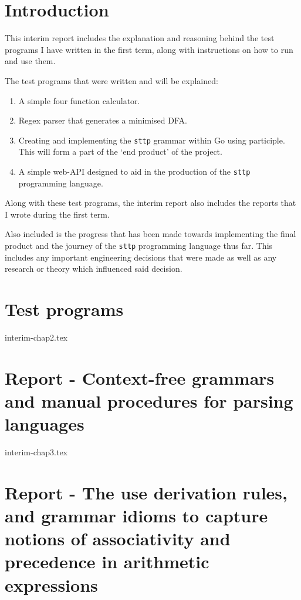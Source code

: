 \documentclass[]{interim}
\theoremstyle{definition}
\begin{document}
\chapter{Introduction}

This interim report includes the explanation and reasoning behind the test programs I have written in the first term, along with instructions on how to run and use them.

\begin{center}
    The test programs that were written and will be explained:
    \vspace{-1em}
    \begin{enumerate}
        \item A simple four function calculator.
        \item Regex parser that generates a minimised DFA.
        \item Creating and implementing the \verb|sttp| grammar within Go using participle. This will form a part of the `end product' of the project.
        \item A simple web-API designed to aid in the production of the \verb|sttp| programming language.
    \end{enumerate}
\end{center}

Along with these test programs, the interim report also includes the reports that I wrote during the first term.

Also included is the progress that has been made towards implementing the final product and the journey of the \verb|sttp| programming language thus far. This includes any important engineering decisions that were made as well as any research or theory which influenced said decision.

\chapter{Test programs}

{interim-chap2.tex}

\chapter{Report - Context-free grammars and manual procedures for parsing languages}

{interim-chap3.tex}

\chapter{Report - The use derivation rules, and grammar idioms to capture notions of associativity and precedence in arithmetic expressions}
\end{document}
